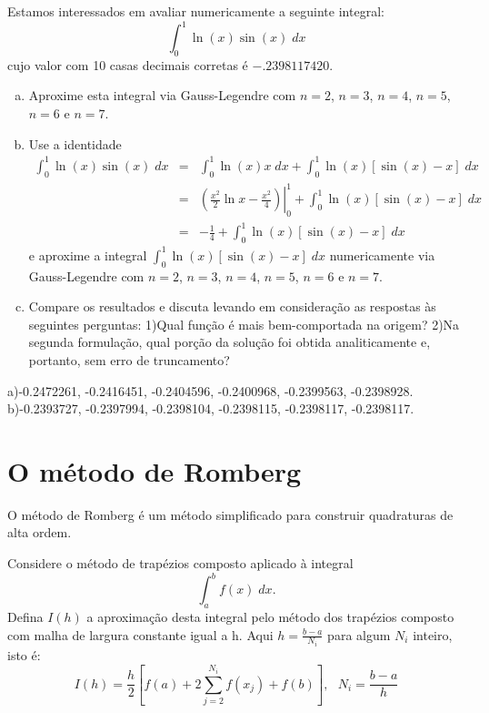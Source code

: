 \begin{exer}
Estamos interessados em avaliar numericamente a seguinte integral:
$$\int_0^1 \ln(x)\sin(x)\;dx$$
cujo valor com 10 casas decimais corretas é $-.2398117420$.
\begin{enumerate}[a)]
\item Aproxime esta integral via Gauss-Legendre com $n=2$, $n=3$, $n=4$, $n=5$, $n=6$ e $n=7$.
\item Use a identidade
\begin{eqnarray*}
\int_0^1 \ln(x)\sin(x)\;dx&=&\int_0^1 \ln(x)x\;dx+\int_0^1 \ln(x)\left[\sin(x)-x\right]\;dx\\
&=&\left.\left(\frac{x^2}{2}\ln x-\frac{x^2}{4}\right)\right|_0^1+\int_0^1 \ln(x)\left[\sin(x)-x\right]\;dx\\
&=&-\frac{1}{4}+\int_0^1 \ln(x)\left[\sin(x)-x\right]\;dx
\end{eqnarray*}
e aproxime a integral $\int_0^1 \ln(x)\left[\sin(x)-x\right]\;dx$ numericamente via Gauss-Legendre com $n=2$, $n=3$, $n=4$, $n=5$, $n=6$ e $n=7$.
\item Compare os resultados e discuta levando em consideração as respostas às seguintes perguntas: 1)Qual função é mais bem-comportada na origem? 2)Na segunda formulação, qual porção da solução foi obtida analiticamente e, portanto, sem erro de truncamento?
\end{enumerate}
\end{exer}
\begin{resp}

    a)-0.2472261,  -0.2416451,  -0.2404596,  -0.2400968,  -0.2399563,  -0.2398928.
    b)-0.2393727,  -0.2397994,  -0.2398104,  -0.2398115,  -0.2398117,  -0.2398117.

\end{resp}

\section{O método de Romberg}
O método de Romberg é um método simplificado para construir quadraturas de alta ordem.

Considere o método de trapézios composto aplicado à integral
$$\int_a^bf(x)\;dx.$$
Defina $I(h)$ a aproximação desta integral pelo método dos trapézios composto com  malha de largura constante igual a h. Aqui $h=\frac{b-a}{N_i}$ para algum $N_i$ inteiro, isto é:
$$I(h)=\frac{h}{2}\left[f(a)+2\sum_{j=2}^{N_i} f(x_j)+ f(b)\right],~~~N_i=\frac{b-a}{h}$$

